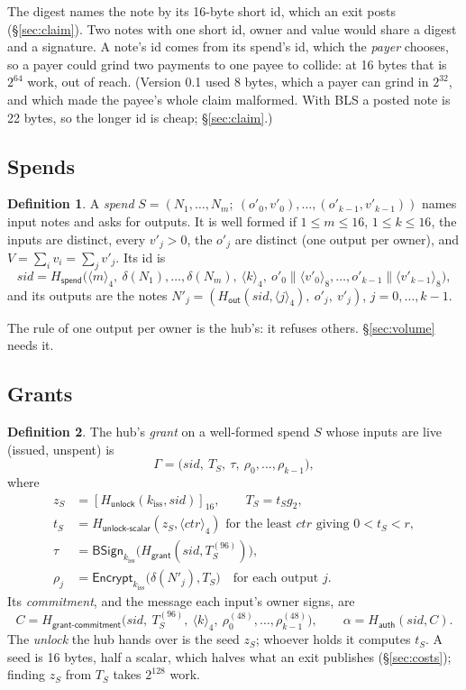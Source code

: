 \documentclass[11pt]{article}
\theoremstyle{plain}
\theoremstyle{definition}
\newtheorem{definition}{Definition}
\newcommand{\be}[2]{\langle #1\rangle_{#2}}
\newcommand{\pre}[2]{[#1]_{#2}}
\newcommand{\Ht}[1]{H_{\textsf{#1}}}
\newcommand{\kiss}{k_{\mathrm{iss}}}
\newcommand{\sid}{\mathit{sid}}
\newcommand{\BSign}{\mathsf{BSign}}
\newcommand{\Enc}{\mathsf{Encrypt}}
\begin{document}
The digest names the note by its 16-byte short id, which an exit posts
(\S\ref{sec:claim}). Two notes with one short id, owner and value would
share a digest and a signature. A note's id comes from its spend's id,
which the \emph{payer} chooses, so a payer could grind two payments to
one payee to collide: at 16 bytes that is $2^{64}$ work, out of reach.
(Version 0.1 used 8 bytes, which a payer can grind in $2^{32}$, and
which made the payee's whole claim malformed. With BLS a posted note is
22 bytes, so the longer id is cheap; \S\ref{sec:claim}.)

\subsection{Spends}

\begin{definition}
A \emph{spend} $S = (N_1, \dots, N_m;\ (o'_0, v'_0), \dots, (o'_{k-1},
v'_{k-1}))$ names input notes and asks for outputs. It is well formed if
$1 \le m \le 16$, $1 \le k \le 16$, the inputs are distinct, every
$v'_j > 0$, the $o'_j$ are distinct (one output per owner), and $V =
\sum_i v_i = \sum_j v'_j$. Its id is
\[
  \sid = \Ht{spend}\big(\be{m}{4},\ \delta(N_1), \dots, \delta(N_m),\
  \be{k}{4},\ o'_0 \| \be{v'_0}{8}, \dots, o'_{k-1} \| \be{v'_{k-1}}{8}\big),
\]
and its outputs are the notes $N'_j = (\Ht{out}(\sid, \be{j}{4}),\ o'_j,\
v'_j)$, $j = 0, \dots, k-1$.
\end{definition}

The rule of one output per owner is the hub's: it refuses others.
\S\ref{sec:volume} needs it.

\subsection{Grants}\label{sec:grant}

\begin{definition}
The hub's \emph{grant} on a well-formed spend $S$ whose inputs are live
(issued, unspent) is
\[
  \Gamma = \big(\sid,\ T_S,\ \tau,\ \rho_0, \dots, \rho_{k-1}\big),
\]
where
\begin{align*}
  z_S &= \pre{\Ht{unlock}(\kiss, \sid)}{16},\qquad T_S = t_S g_2,\\
  t_S &= \Ht{unlock-scalar}(z_S, \be{\mathit{ctr}}{4}) \text{ for the least
  } \mathit{ctr} \text{ giving } 0 < t_S < r,\\
  \tau &= \BSign_{\kiss}\big(\Ht{grant}(\sid, T_S^{(96)})\big),\\
  \rho_j &= \Enc_{\kiss}\big(\delta(N'_j), T_S\big)\quad \text{for each output } j.
\end{align*}
Its \emph{commitment}, and the message each input's owner signs, are
\[
  C = \Ht{grant-commitment}\big(\sid,\ T_S^{(96)},\ \be{k}{4},\
  \rho_0^{(48)}, \dots, \rho_{k-1}^{(48)}\big),\qquad
  \alpha = \Ht{auth}(\sid, C).
\]
The \emph{unlock} the hub hands over is the seed $z_S$; whoever holds it
computes $t_S$. A seed is 16 bytes, half a scalar, which halves what an
exit publishes (\S\ref{sec:costs}); finding $z_S$ from $T_S$ takes
$2^{128}$ work.
\end{definition}
\end{document}
